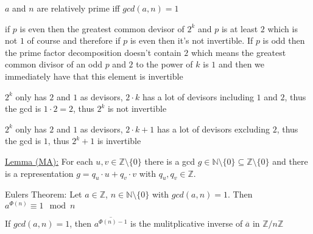 \documentclass[landscape, a4paper]{article}
\begin{document}
\begin{minipage}[t]{0.2\linewidth}
\begin{betterlist}
\begin{betterlist}
			\item $a$ and $n$ are \alert{relatively prime} \alert{iff} $gcd(a, n) = 1$
			\item if $p$ is even then the greatest common devisor of $2^k$ and $p$ is at least $2$ which is not $1$ of course and therefore if $p$ is even then it's not invertible. If $p$ is odd then the prime factor decomposition doesn't contain $2$ which means the greatest common divisor of an odd $p$ and $2$ to the power of $k$ is $1$ and then we immediately have that this element is invertible %
			\begin{betterlist}
				\item $2^k$ only has $2$ and $1$ as devisors, $2\cdot k$ has a lot of devisors including $1$ and $2$, thus the gcd is $1\cdot 2 = 2$, thus $2^k$ is not invertible
				\item $2^k$ only has $2$ and $1$ as devisors, $2\cdot k+1$ has a lot of devisors excluding $2$, thus the gcd is $1$, thus $2^k+1$ is invertible
			\end{betterlist}
			\item \underline{Lemma (MA):} For each $u, v \in \mathbb{Z} \setminus \{0\}$ there is a gcd $g \in \mathbb{N} \setminus \{0\} \subseteq \mathbb{Z} \setminus \{0\}$ and there is a representation $g = q_u \cdot u + q_v \cdot v$ with $q_u, q_v \in \mathbb{Z}$.
		\end{betterlist}
		\item \alert{Eulers Theorem:} Let $a\in \mathbb{Z}$, $n\in \mathbb{N}\setminus \{0\}$ with $gcd(a, n) = 1$. Then $a^{\Phi(n)}\equiv 1 \mod n$
		\begin{betterlist}
			\item If $gcd(a, n) = 1$, then $\overline{a^{\Phi(n)-1}}$ is the \alert{mulitplicative inverse} of $\overline{a}$ in $\mathbb{Z}/n\mathbb{Z}$

\end{betterlist}
\end{betterlist}
\end{minipage}
\end{document}
